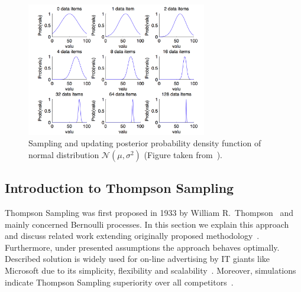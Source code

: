 \documentclass[12pt, a4paper, pdflatex, leqno]{report}
\begin{document}
\begin{figure}[htbp]
\centering
\includegraphics[width=0.7\textwidth]{graphics/sampling.png}
\begin{tiny}
\caption{Sampling and updating posterior probability density function of normal distribution $\mathcal{N}\left( \mu , \sigma^2 \right)$ (Figure taken from~\citep{Jacobs2008normalnormal}).\label{fig:sampling}}
\end{tiny}
\vspace{1cm}
\end{figure}


\subsection{Introduction to Thompson Sampling\label{sec:thompson}}
Thompson Sampling was first proposed in 1933 by William R.\ Thompson~\citep{thompson:biom33} and mainly concerned Bernoulli processes. In this section we explain this approach and discuss related work extending originally proposed methodology~\citep{May:2012:OBS:2503308.2343711}. Furthermore, under presented assumptions the approach behaves optimally.\\
Described solution is widely used for on-line advertising by IT giants like Microsoft due to its simplicity, flexibility and scalability~\citep{graepel2010web}. Moreover, simulations indicate Thompson Sampling superiority over all competitors~\citep{May:simulation}.\\


\end{document}
